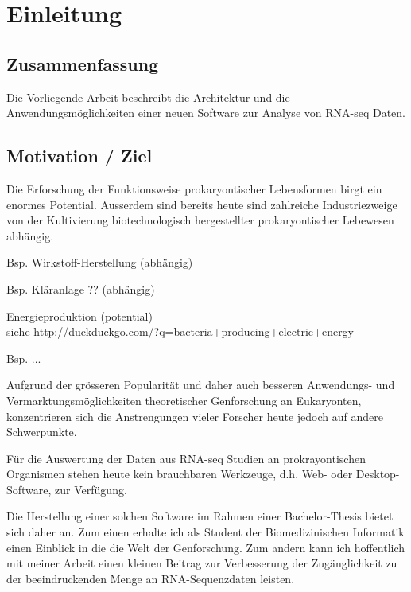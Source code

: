 \documentclass[a4paper]{thesis}
\begin{document}

\renewcommand\contentsname{Inhalt}
\tableofcontents
\listoftodos
\newpage

\section{Einleitung}

\subsection{Zusammenfassung}

Die Vorliegende Arbeit beschreibt die Architektur und die
Anwendungs\-möglichkeiten einer neuen Software zur Analyse von RNA-seq Daten.

\subsection{Motivation / Ziel}

Die Erforschung der Funktionsweise prokaryontischer Lebensformen birgt ein
enormes Potential. Ausserdem sind bereits heute sind zahlreiche
Industriezweige von der Kultivierung biotechnologisch hergestellter
prokaryontischer Lebewesen abhängig.

\begin{list}{-}{}
 \item Bsp. Wirkstoff-Herstellung (abhängig)
 \item Bsp. Kläranlage ?? (abhängig)
 \item Energieproduktion (potential)
       \\siehe \url{http://duckduckgo.com/?q=bacteria+producing+electric+energy}
 \item Bsp. ... 
\end{list}

Aufgrund der grösseren Popularität und daher auch besseren
Anwendungs- und Vermarktungsmöglichkeiten theoretischer Genforschung an
Eukaryonten, konzentrieren sich die Anstrengungen vieler Forscher heute
jedoch auf andere Schwerpunkte.

Für die Auswertung der Daten aus RNA-seq Studien an prokrayontischen
Organismen stehen heute kein brauchbaren Werkzeuge, d.h.
Web- oder Desktop- Software, zur Verfügung.

Die Herstellung einer solchen Software im Rahmen einer Bachelor-Thesis
bietet sich daher an. Zum einen erhalte ich als Student der Biomedizinischen
Informatik einen Einblick in die die Welt der Genforschung. Zum andern kann ich
hoffentlich mit meiner Arbeit einen kleinen Beitrag zur Verbesserung der
Zugänglichkeit zu der beeindruckenden Menge an RNA-Sequenzdaten leisten.
\end{document}
